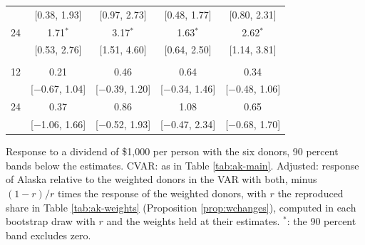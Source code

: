 \begin{table}[htbp]
\begin{tabular}{lcccc}
 & [0.38, 1.93] & [0.97, 2.73] & [0.48, 1.77] & [0.80, 2.31] \\
24 & 1.71$^{*}$ & 3.17$^{*}$ & 1.63$^{*}$ & 2.62$^{*}$ \\
 & [0.53, 2.76] & [1.51, 4.60] & [0.64, 2.50] & [1.14, 3.81] \\
\addlinespace
\multicolumn{5}{l}{Retail trade} \\
12 & 0.21 & 0.46 & 0.64 & 0.34 \\
 & [$-$0.67, 1.04] & [$-$0.39, 1.20] & [$-$0.34, 1.46] & [$-$0.48, 1.06] \\
24 & 0.37 & 0.86 & 1.08 & 0.65 \\
 & [$-$1.06, 1.66] & [$-$0.52, 1.93] & [$-$0.47, 2.34] & [$-$0.68, 1.70] \\
\bottomrule
\end{tabular}
\par\smallskip\parbox{0.95\textwidth}{\footnotesize Response to a dividend of \$1,000 per person with the six donors, 90 percent bands below the estimates. CVAR: as in Table \ref{tab:ak-main}. Adjusted: response of Alaska relative to the weighted donors in the VAR with both, minus $(1-r)/r$ times the response of the weighted donors, with $r$ the reproduced share in Table \ref{tab:ak-weights} (Proposition \ref{prop:wchanges}), computed in each bootstrap draw with $r$ and the weights held at their estimates. $^{*}$: the 90 percent band excludes zero.}
\end{table}
